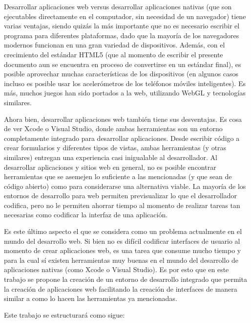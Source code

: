 \documentclass[12pt,titlepage,]{article}
\begin{document}
Desarrollar aplicaciones web versus desarrollar aplicaciones nativas
(que son ejecutables directamente en el computador, sin necesidad de un
navegador) tiene varias ventajas, siendo quizás la más importante que no
es necesario escribir el programa para diferentes plataformas, dado que
la mayoría de los navegadores modernos funcionan en una gran variedad de
dispositivos. Además, con el crecimiento del estándar HTML5 (que al
momento de escribir el presente documento aun se encuentra en proceso de
convertirse en un estándar final), es posible aprovechar muchas
características de los dispositivos (en algunos casos incluso es posible
usar los acelerómetros de los teléfonos móviles inteligentes). Es más,
muchos juegos han sido portados a la web, utilizando WebGL y tecnologías
similares.

Ahora bien, desarrollar aplicaciones web también tiene sus desventajas.
Es cosa de ver Xcode o Visual Studio, donde ambas herramientas son un
entorno completamente integrado para desarrollar aplicaciones. Desde
escribir código a crear formularios y diferentes tipos de vistas, ambas
herramientas (y otras similares) entregan una experiencia casi
inigualable al desarrollador. Al desarrollar aplicaciones y sitios web
en general, no es posible encontrar herramientas que se asemejen lo
suficiente a las mencionadas (y que sean de código abierto) como para
considerarse una alternativa viable. La mayoría de los entornos de
desarrollo para web permiten previsualizar lo que el desarrollador
codifica, pero no le permiten ahorrar tiempo al momento de realizar
tareas tan necesarias como codificar la interfaz de una aplicación.

Es este último aspecto el que se considera como un problema actualmente
en el mundo del desarrollo web. Si bien no es difícil codificar
interfaces de usuario al momento de crear aplicaciones web, es una tarea
que consume mucho tiempo y para la cual sí existen herramientas muy
buenas en el mundo del desarrollo de aplicaciones nativas (como Xcode o
Visual Studio). Es por esto que en este trabajo se propone la creación
de un entorno de desarrollo integrado que permita la creación de
aplicaciones web facilitando la creación de interfaces de manera similar
a como lo hacen las herramientas ya mencionadas.

Este trabajo se estructurará como sigue:
\end{document}
